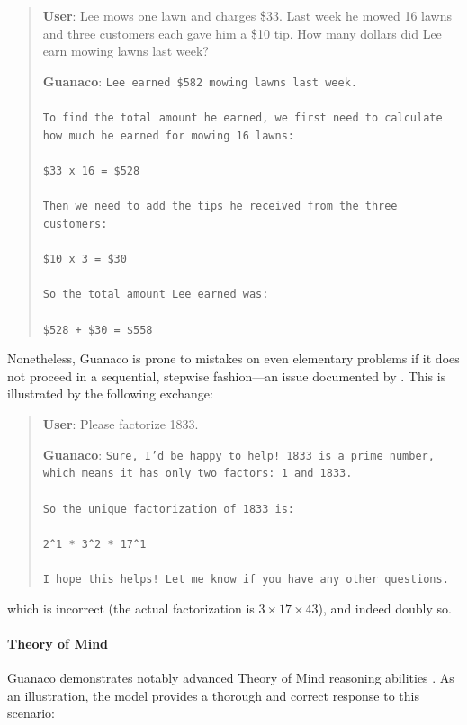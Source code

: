 \begin{quote}
    \textbf{User}: Lee mows one lawn and charges \$33. Last week he mowed 16 lawns and three customers each gave him a \$10 tip. How many dollars did Lee earn mowing lawns last week?

    \textbf{Guanaco}: \texttt{Lee earned \$582 mowing lawns last week. \\ \\ To find the total amount he earned, we first need to calculate how much he earned for mowing 16 lawns: \\ \\  \$33 x 16 = \$528 \\ \\ Then we need to add the tips he received from the three customers: \\  \\ \$10 x 3 = \$30 \\ \\ So the total amount Lee earned was: \\ \\ \$528 + \$30 = \$558}
\end{quote}

Nonetheless, {Guanaco} is prone to mistakes on even elementary problems if it does not proceed in a sequential, stepwise fashion—an issue documented by \cite{weichain}. This is illustrated by the following exchange:

\begin{quote}
    \textbf{User}: Please factorize 1833.

    \textbf{Guanaco}: \texttt{Sure, I'd be happy to help! 1833 is a prime number, which means it has only two factors: 1 and 1833. \\ \\ So the unique factorization of 1833 is: \\ \\ 2\^{}1 * 3\^{}2 * 17\^{}1 \\ \\ I hope this helps! Let me know if you have any other questions.}
\end{quote}

which is incorrect (the actual factorization is $3 \times 17 \times 43$), and indeed doubly so.

\paragraph{Theory of Mind} {Guanaco} demonstrates notably advanced Theory of Mind reasoning abilities \cite{nematzadeh2018evaluating, sap2022neural}. As an illustration, the model provides a thorough and correct response to this scenario:


